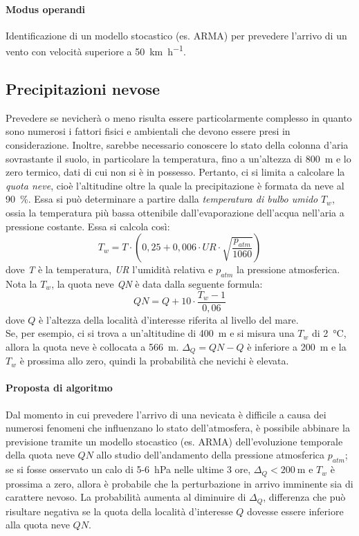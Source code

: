 \paragraph{Modus operandi} Identificazione di un modello stocastico (es. ARMA) per prevedere l'arrivo di un vento con velocità superiore a \SI[per-mode=symbol-or-fraction]{50}{\kilo\meter\per\hour}. 

\subsection{Precipitazioni nevose}
Prevedere se nevicherà o meno risulta essere particolarmente complesso in quanto sono numerosi i fattori fisici e ambientali che devono essere presi in considerazione. Inoltre, sarebbe necessario conoscere lo stato della colonna d'aria sovrastante il suolo, in particolare la temperatura, fino a un'altezza di \SI{800}{\meter} e lo zero termico, dati di cui non si è in possesso. Pertanto, ci si limita a calcolare la \textit{quota neve}, cioè l'altitudine oltre la quale la precipitazione è formata da neve al \SI{90}{\percent}. Essa si può determinare a partire dalla \textit{temperatura di bulbo umido} $T_w$, ossia la temperatura più bassa ottenibile dall’evaporazione dell’acqua nell’aria a pressione costante. Essa si calcola così:
\[ T_w = T \cdot (0,25 + 0,006 \cdot UR \cdot \sqrt{\frac{p_{atm}}{1060}})\]
dove \textit{T} è la temperatura, \textit{UR} l'umidità relativa e $p_{atm}$ la pressione atmosferica.
Nota la $T_w$, la quota neve \textit{QN} è data dalla seguente formula:
\[ QN = Q + 10 \cdot \frac{T_w - 1}{0,06}\]
dove $Q$ è l'altezza della località d'interesse riferita al livello del mare.\\Se, per esempio, ci si trova a un'altitudine di \SI{400}{\meter} e si misura una $T_w$ di \SI{2}{\degreeCelsius}, allora la quota neve è collocata a \SI{566}{\meter}. $\Delta_Q = QN - Q$ è inferiore a \SI{200}{\meter} e la $T_w$ è prossima allo zero, quindi la probabilità che nevichi è elevata. 

\paragraph{Proposta di algoritmo} Dal momento in cui prevedere l'arrivo di una nevicata è difficile a causa dei numerosi fenomeni che influenzano lo stato dell'atmosfera, è possibile abbinare la previsione tramite un modello stocastico (es. ARMA) dell'evoluzione temporale della quota neve $QN$ allo studio dell'andamento della pressione atmosferica $p_{atm}$; se si fosse osservato un calo di 5-\SI{6}{\hecto\pascal} nelle ultime 3 ore, $\Delta_Q < \SI{200}{\meter}$ e $T_w$ è prossima a zero, allora è probabile che la perturbazione in arrivo imminente sia di carattere nevoso. La probabilità aumenta al diminuire di $\Delta_Q$, differenza che può risultare negativa se la quota della località d'interesse $Q$ dovesse essere inferiore alla quota neve $QN$. 